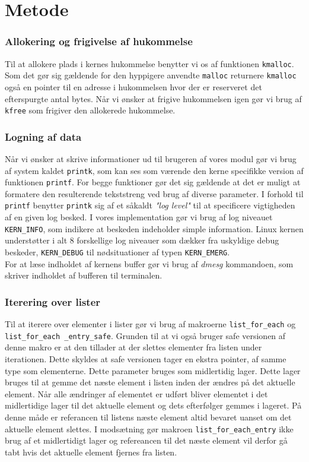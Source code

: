 \documentclass[main.tex]{subfile}
\begin{document}
\section{Metode}
\subsubsection*{Allokering og frigivelse af hukommelse}
Til at allokere plads i kernes hukommelse benytter vi os af funktionen \texttt{kmalloc}. Som det gør sig gældende for den hyppigere anvendte \texttt{malloc} returnere \texttt{kmalloc} også en pointer til en adresse i hukommelsen hvor der er reserveret det efterspurgte antal bytes. Når vi ønsker at frigive hukommelsen igen gør vi brug af \texttt{kfree} som frigiver den allokerede hukommelse.

\subsubsection*{Logning af data}
Når vi ønsker at skrive informationer ud til brugeren af vores modul gør vi brug af system kaldet \texttt{printk}, som kan ses som værende den kerne specifikke version af funktionen \texttt{printf}. For begge funktioner gør det sig gældende at det er muligt at formatere den resulterende tekststreng ved brug af diverse parameter. I forhold til \texttt{printf} benytter \texttt{printk} sig af et såkaldt \emph{"log level"} til at specificere vigtigheden af en given log besked. I vores implementation gør vi brug af log niveauet \texttt{KERN\_INFO}, som indikere at beskeden indeholder simple information. Linux kernen understøtter i alt 8 forskellige log niveauer som dækker fra uskyldige debug beskeder, \texttt{KERN\_DEBUG} til nødsituationer af typen \texttt{KERN\_EMERG}.\\

For at læse indholdet af kernens buffer gør vi brug af \emph{dmesg} kommandoen, som skriver indholdet af bufferen til terminalen. 

\subsubsection*{Iterering over lister}
Til at iterere over elementer i lister gør vi brug af makroerne \texttt{list\_for\_each} og \texttt{list\_for\_each \_entry\_safe}. Grunden til at vi også bruger safe versionen af denne makro er at den tillader at der slettes elementer fra listen under iterationen. Dette skyldes at safe versionen tager en ekstra pointer, af samme type som elementerne. Dette parameter bruges som midlertidig lager. Dette lager bruges til at gemme det næste element i listen inden der ændres på det aktuelle element. Når alle ændringer af elementet er udført bliver elementet i det midlertidige lager til det aktuelle element og dets efterfølger gemmes i lageret. På denne måde er referancen til listens næste element altid bevaret uanset om det aktuelle element slettes. I modsætning gør makroen \texttt{list\_for\_each\_entry} ikke brug af et midlertidigt lager og refereancen til det næste element vil derfor gå tabt hvis det aktuelle element fjernes fra listen.
\end{document}
